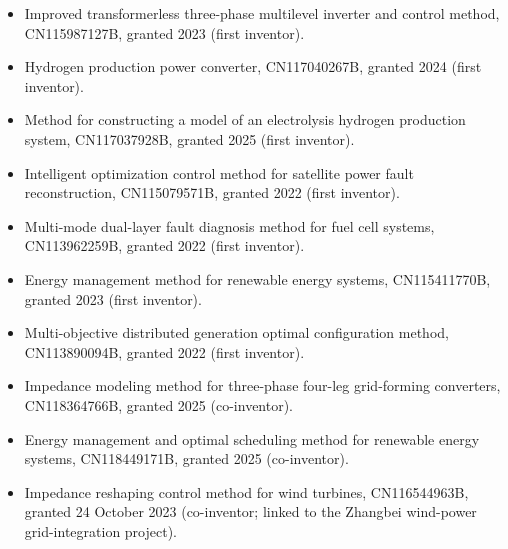 \documentclass[10pt,a4paper]{article}
\begin{document}
\begin{itemize}\item Improved transformerless three-phase multilevel inverter and control method, CN115987127B, granted 2023 (first inventor).\end{itemize}

\begin{itemize}\item Hydrogen production power converter, CN117040267B, granted 2024 (first inventor).\end{itemize}

\begin{itemize}\item Method for constructing a model of an electrolysis hydrogen production system, CN117037928B, granted 2025 (first inventor).\end{itemize}

\begin{itemize}\item Intelligent optimization control method for satellite power fault reconstruction, CN115079571B, granted 2022 (first inventor).\end{itemize}

\begin{itemize}\item Multi-mode dual-layer fault diagnosis method for fuel cell systems, CN113962259B, granted 2022 (first inventor).\end{itemize}

\begin{itemize}\item Energy management method for renewable energy systems, CN115411770B, granted 2023 (first inventor).\end{itemize}

\begin{itemize}\item Multi-objective distributed generation optimal configuration method, CN113890094B, granted 2022 (first inventor).\end{itemize}

\begin{itemize}\item Impedance modeling method for three-phase four-leg grid-forming converters, CN118364766B, granted 2025 (co-inventor).\end{itemize}

\begin{itemize}\item Energy management and optimal scheduling method for renewable energy systems, CN118449171B, granted 2025 (co-inventor).\end{itemize}

\begin{itemize}\item Impedance reshaping control method for wind turbines, CN116544963B, granted 24 October 2023 (co-inventor; linked to the Zhangbei wind-power grid-integration project).\end{itemize}
\end{document}
